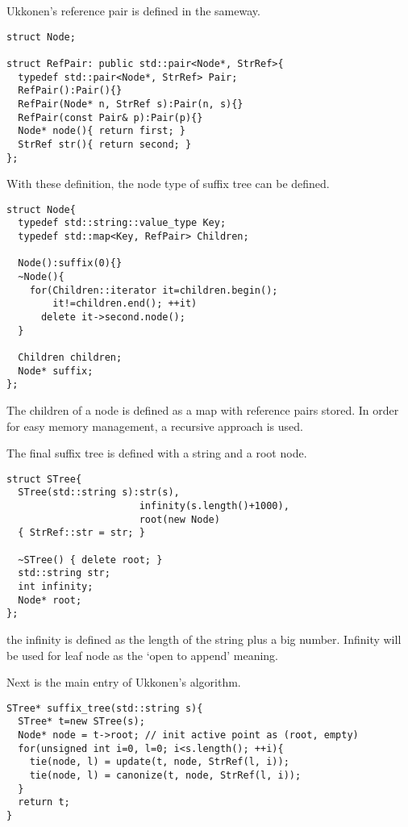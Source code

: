 \documentclass{article}
\begin{document}
Ukkonen's reference pair is defined in the sameway.

\begin{lstlisting}
struct Node;

struct RefPair: public std::pair<Node*, StrRef>{
  typedef std::pair<Node*, StrRef> Pair;
  RefPair():Pair(){}
  RefPair(Node* n, StrRef s):Pair(n, s){}
  RefPair(const Pair& p):Pair(p){}
  Node* node(){ return first; }
  StrRef str(){ return second; }
};
\end{lstlisting}

With these definition, the node type of suffix tree
can be defined.

\begin{lstlisting}
struct Node{
  typedef std::string::value_type Key;
  typedef std::map<Key, RefPair> Children;

  Node():suffix(0){}
  ~Node(){
    for(Children::iterator it=children.begin();
        it!=children.end(); ++it)
      delete it->second.node();
  }

  Children children;
  Node* suffix;
};
\end{lstlisting}

The children of a node is defined as a map with reference pairs stored.
In order for easy memory management, a recursive approach is used.

The final suffix tree is defined with a string and a root node.

\begin{lstlisting}
struct STree{
  STree(std::string s):str(s), 
                       infinity(s.length()+1000), 
                       root(new Node)
  { StrRef::str = str; }

  ~STree() { delete root; }
  std::string str;
  int infinity;
  Node* root;
};
\end{lstlisting}

the infinity is defined as the length of the string plus a big number.
Infinity will be used for leaf node as the `open to append' meaning.

Next is the main entry of Ukkonen's algorithm.

\begin{lstlisting}
STree* suffix_tree(std::string s){
  STree* t=new STree(s);
  Node* node = t->root; // init active point as (root, empty)
  for(unsigned int i=0, l=0; i<s.length(); ++i){
    tie(node, l) = update(t, node, StrRef(l, i));
    tie(node, l) = canonize(t, node, StrRef(l, i));
  }
  return t;
}
\end{lstlisting}
\end{document}
